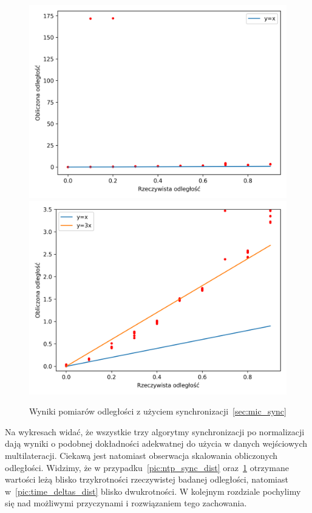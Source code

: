 \begin{figure}[h]
\centering
    \includegraphics[width=.49\textwidth]{pics/mic_sync_dist/dists.png}
    \includegraphics[width=.49\textwidth]{pics/mic_sync_dist/dists_close.png}
\caption{Wyniki pomiarów odległości z użyciem synchronizacji~\ref{sec:mic_sync}}
\label{pic:mic_sync_dist}
\end{figure}

Na wykresach widać, że wszystkie trzy algorytmy synchronizacji po normalizacji dają wyniki o podobnej dokładności adekwatnej do użycia w danych wejściowych multilateracji. Ciekawą jest natomiast obserwacja skalowania obliczonych odległości. Widzimy, że w przypadku~\ref{pic:ntp_sync_dist} oraz~\ref{pic:mic_sync_dist} otrzymane wartości leżą blisko trzykrotności rzeczywistej badanej odległości, natomiast w~\ref{pic:time_deltas_dist} blisko dwukrotności. W kolejnym rozdziale pochylimy się nad możliwymi przyczynami i rozwiązaniem tego zachowania.